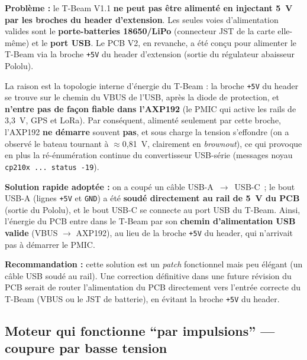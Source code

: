 \documentclass[12pt,a4paper]{article}
\begin{document}
\begin{warningbox}
  \textbf{Probl\`eme :} le T-Beam V1.1 \textbf{ne peut pas \^etre aliment\'e en
  injectant 5~V par les broches du header d'extension}. Les seules voies
  d'alimentation valides sont le \textbf{porte-batteries 18650/LiPo} (connecteur JST
  de la carte elle-m\^eme) et le \textbf{port USB}. Le PCB V2, en revanche, a \'et\'e
  con\c{c}u pour alimenter le T-Beam via la broche \texttt{+5V} du header d'extension
  (sortie du r\'egulateur abaisseur Pololu).

  La raison est la topologie interne d'\'energie du T-Beam : la broche \texttt{+5V}
  du header se trouve sur le chemin du VBUS de l'USB, apr\`es la diode de protection,
  et \textbf{n'entre pas de fa\c{c}on fiable dans l'AXP192} (le PMIC qui active les
  rails de 3,3~V, GPS et LoRa). Par cons\'equent, aliment\'e seulement par cette
  broche, l'AXP192 \textbf{ne d\'emarre} souvent \textbf{pas}, et sous charge la
  tension s'effondre (on a observ\'e le bateau tournant à $\approx$0,81~V, clairement
  en \emph{brownout}), ce qui provoque en plus la r\'e-\'enum\'eration continue du
  convertisseur USB-s\'erie (messages noyau \texttt{cp210x ... status -19}).
\end{warningbox}

\begin{okbox}
  \textbf{Solution rapide adopt\'ee :} on a coup\'e un c\^able USB-A~$\to$~USB-C~; le
  bout USB-A (lignes \texttt{+5V} et \texttt{GND}) a \'et\'e \textbf{soud\'e
  directement au rail de 5~V du PCB} (sortie du Pololu), et le bout USB-C se connecte
  au port USB du T-Beam. Ainsi, l'\'energie du PCB entre dans le T-Beam par son
  \textbf{chemin d'alimentation USB valide} (VBUS $\to$ AXP192), au lieu de la broche
  \texttt{+5V} du header, qui n'arrivait pas à d\'emarrer le PMIC.

  \textbf{Recommandation :} cette solution est un \emph{patch} fonctionnel mais peu
  \'el\'egant (un c\^able USB soud\'e au rail). Une correction d\'efinitive dans une
  future r\'evision du PCB serait de router l'alimentation du PCB directement vers
  l'entr\'ee correcte du T-Beam (VBUS ou le JST de batterie), en \'evitant la broche
  \texttt{+5V} du header.
\end{okbox}

\subsection{Moteur qui fonctionne ``par impulsions'' --- coupure par basse tension}
\label{subsec:lvc}
\end{document}
